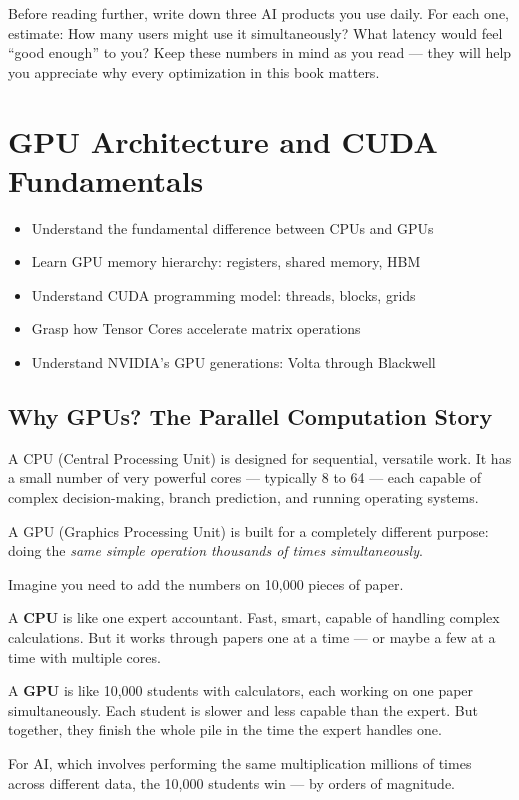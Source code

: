 \documentclass[11pt, twoside, openright]{book}
\newcommand{\analogybox}[2]{\begin{tcolorbox}[analogystyle, title={Analogy: #1}]#2\end{tcolorbox}}
\newenvironment{learningobjectives}
  {\begin{tcolorbox}[enhanced, breakable,
    colback={rgb,255:red,232;green,240;blue,255},
    colframe=NavyBlue, boxrule=1.5pt, arc=4pt,
    title={\bfseries Learning Objectives},
    fonttitle=\bfseries\color{white},
    attach boxed title to top left={yshift=-2mm, xshift=5mm},
    boxed title style={colback=NavyBlue, arc=2pt}]
  \begin{itemize}[leftmargin=1.5em, itemsep=2pt]}
  {\end{itemize}\end{tcolorbox}}
\newcounter{exercise}[chapter]
\newenvironment{exercise}[1][]
  {\refstepcounter{exercise}
   \begin{tcolorbox}[enhanced, breakable,
    colback={rgb,255:red,248;green,248;blue,248},
    colframe=DarkGray, boxrule=0.8pt, arc=3pt,
    title={\bfseries Exercise \thechapter.\theexercise\ifx&#1&\else: #1\fi},
    fonttitle=\bfseries\small,
    attach boxed title to top left={yshift=-2mm, xshift=5mm},
    boxed title style={colback=DarkGray, coltext=white, arc=2pt}]}
  {\end{tcolorbox}}
\begin{document}
\begin{exercise}[Reflection]
Before reading further, write down three AI products you use daily.  For each one,
estimate: How many users might use it simultaneously?  What latency would feel
``good enough'' to you?  Keep these numbers in mind as you read --- they will help
you appreciate why every optimization in this book matters.
\end{exercise}

\chapter{GPU Architecture and CUDA Fundamentals}
\label{ch:gpu}

\begin{learningobjectives}
  \item Understand the fundamental difference between CPUs and GPUs
  \item Learn GPU memory hierarchy: registers, shared memory, HBM
  \item Understand CUDA programming model: threads, blocks, grids
  \item Grasp how Tensor Cores accelerate matrix operations
  \item Understand NVIDIA's GPU generations: Volta through Blackwell
\end{learningobjectives}

\section{Why GPUs? The Parallel Computation Story}

A CPU (Central Processing Unit) is designed for sequential, versatile
work.  It has a small number of very powerful cores --- typically 8 to 64 ---
each capable of complex decision-making, branch prediction, and running operating
systems.

A GPU (Graphics Processing Unit) is built for a completely different
purpose: doing the \textit{same simple operation thousands of times simultaneously}.

\analogybox{One Expert vs.\ One Thousand Students}{
Imagine you need to add the numbers on 10{,}000 pieces of paper.

A \textbf{CPU} is like one expert accountant.  Fast, smart, capable of handling
complex calculations.  But it works through papers one at a time --- or maybe a
few at a time with multiple cores.

A \textbf{GPU} is like 10{,}000 students with calculators, each working on one
paper simultaneously.  Each student is slower and less capable than the expert.
But together, they finish the whole pile in the time the expert handles one.

For AI, which involves performing the same multiplication millions of times across
different data, the 10{,}000 students win --- by orders of magnitude.
}
\end{document}

